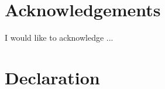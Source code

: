 \documentclass[12pt, a4paper, openany]{report}
\numberwithin{equation}{section}
\begin{document}

\thispagestyle{empty} %
\setcounter{page}{1}

\newpage
\section*{Acknowledgements}
I would like to acknowledge ...
\section*{Declaration}


\newpage
\tableofcontents
\listoffigures
\listoftables

%
\newpage
\setcounter{page}{1}



\newpage


\newpage


\clearpage
{}



\newpage

\end{document}
